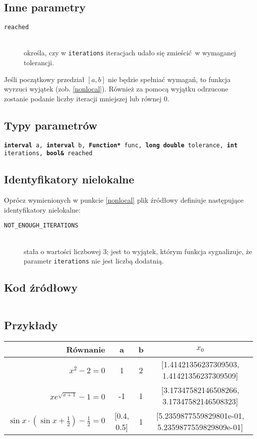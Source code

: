 \documentclass[12pt]{article}
\begin{document}
		\subsection{Inne parametry}
			\begin{description}
				\item[\texttt{reached}] \hfill\\ określa, czy w \texttt{iterations} iteracjach udało się zmieścić w wymaganej tolerancji.
			\end{description}

      Jeśli początkowy przedział $[a, b]$ nie będzie spełniać wymagań, to funkcja wyrzuci wyjątek (zob. \ref{nonlocal}).
      Również za pomocą wyjątku odrzucone zostanie podanie liczby iteracji mniejszej lub równej 0.

		\subsection{Typy parametrów}
			\texttt{\textbf{interval} a, \textbf{interval} b, \textbf{Function*} func, \textbf{long double} tolerance, \textbf{int} iterations, \textbf{bool\&} reached}

		\subsection{Identyfikatory nielokalne}
      Oprócz wymienionych w punkcie \ref{nonlocal} plik źródłowy definiuje następujące identyfikatory nielokalne:

      \begin{description}
				\item[\texttt{NOT\_ENOUGH\_ITERATIONS}] \hfill\\
					stała o wartości liczbowej 3; jest to wyjątek, którym funkcja sygnalizuje, że parametr \texttt{iterations} nie jest liczbą dodatnią.
			\end{description}

		\subsection{Kod źródłowy}
		  \inputminted[firstline=3, lastline=41]{c++}{../solvers/bisection.cpp}

		\subsection{Przykłady}
			\begin{tabular}{|r|c|c||c|}
				\hline
				Równanie & a & b & $x_0$ \\\hline

				$x^2 - 2 = 0$ & 1 & 2 & [1.41421356237309503, 1.41421356237309509] \\\hline
				$xe^{\sqrt{x+1}} - 1 = 0$ & -1 & 1 & [3.17347582146508266, 3.17347582146508323] \\\hline
				$\sin{x} \cdot (\sin{x} + \frac{1}{2}) - \frac{1}{2} = 0$ & [0.4, 0.5] & 1 & [5.2359877559829801e-01, 5.2359877559829809e-01] \\\hline

			\end{tabular}
\end{document}
